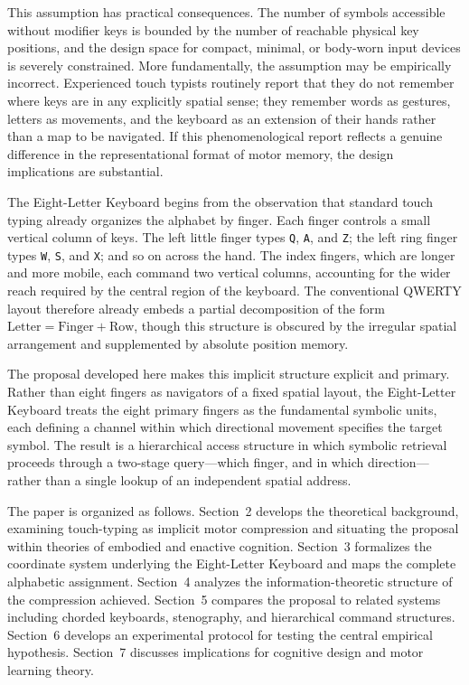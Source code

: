 \documentclass[12pt,a4paper]{article}
\theoremstyle{plain}
\theoremstyle{definition}
\theoremstyle{remark}
\begin{document}
This assumption has practical consequences. The number of symbols accessible
without modifier keys is bounded by the number of reachable physical key
positions, and the design space for compact, minimal, or body-worn input devices
is severely constrained. More fundamentally, the assumption may be empirically
incorrect. Experienced touch typists routinely report that they do not remember
where keys are in any explicitly spatial sense; they remember words as gestures,
letters as movements, and the keyboard as an extension of their hands rather than
a map to be navigated. If this phenomenological report reflects a genuine
difference in the representational format of motor memory, the design implications
are substantial.

The Eight-Letter Keyboard begins from the observation that standard touch typing
already organizes the alphabet by finger. Each finger controls a small vertical
column of keys. The left little finger types \texttt{Q}, \texttt{A}, and
\texttt{Z}; the left ring finger types \texttt{W}, \texttt{S}, and \texttt{X};
and so on across the hand. The index fingers, which are longer and more mobile,
each command two vertical columns, accounting for the wider reach required by
the central region of the keyboard. The conventional QWERTY layout therefore
already embeds a partial decomposition of the form $\text{Letter} = \text{Finger}
+ \text{Row}$, though this structure is obscured by the irregular spatial
arrangement and supplemented by absolute position memory.

The proposal developed here makes this implicit structure explicit and primary.
Rather than eight fingers as navigators of a fixed spatial layout, the
Eight-Letter Keyboard treats the eight primary fingers as the fundamental
symbolic units, each defining a channel within which directional movement
specifies the target symbol. The result is a hierarchical access structure in
which symbolic retrieval proceeds through a two-stage query---which finger, and
in which direction---rather than a single lookup of an independent spatial
address.

The paper is organized as follows. Section~2 develops the theoretical
background, examining touch-typing as implicit motor compression and situating
the proposal within theories of embodied and enactive cognition. Section~3
formalizes the coordinate system underlying the Eight-Letter Keyboard and maps
the complete alphabetic assignment. Section~4 analyzes the information-theoretic
structure of the compression achieved. Section~5 compares the proposal to related
systems including chorded keyboards, stenography, and hierarchical command
structures. Section~6 develops an experimental protocol for testing the central
empirical hypothesis. Section~7 discusses implications for cognitive design and
motor learning theory.
\end{document}
